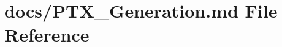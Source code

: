 \hypertarget{PTX__Generation_8md}{}\section{docs/\+P\+T\+X\+\_\+\+Generation.md File Reference}
\label{PTX__Generation_8md}
